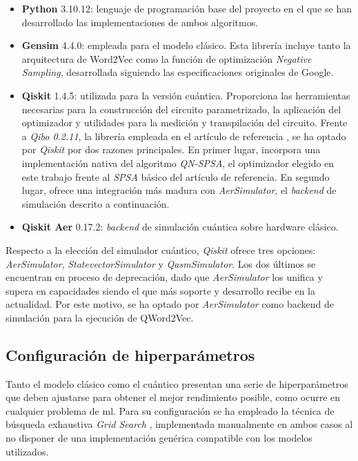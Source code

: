 \begin{itemize}
  \item \textbf{Python} 3.10.12: lenguaje de programación base del proyecto en el que se han desarrollado las implementaciones de ambos algoritmos.
  \item \textbf{Gensim} 4.4.0: empleada para el modelo clásico. Esta librería incluye tanto la arquitectura de Word2Vec como la función de optimización \textit{Negative Sampling}, desarrollada siguiendo las especificaciones originales de Google.
  \item \textbf{Qiskit} 1.4.5: utilizada para la versión cuántica. Proporciona las herramientas necesarias para la construcción del circuito parametrizado, la aplicación del optimizador y utilidades para la medición y transpilación del circuito. Frente a \textit{Qibo 0.2.11}, la librería empleada en el artículo de referencia \cite{ohno_qword2vec_2025}, se ha optado por \textit{Qiskit} por dos razones principales. En primer lugar, incorpora una implementación nativa del algoritmo \textit{QN-SPSA}, el optimizador elegido en este trabajo frente al \textit{SPSA} básico del artículo de referencia. En segundo lugar, ofrece una integración más madura con \textit{AerSimulator}, el \textit{backend} de simulación descrito a continuación.
  \item \textbf{Qiskit Aer} 0.17.2: \textit{backend} de simulación cuántica sobre hardware clásico.
\end{itemize}

Respecto a la elección del simulador cuántico, \textit{Qiskit} ofrece tres opciones: \textit{AerSimulator}, \textit{StatevectorSimulator} y \textit{QasmSimulator}. Los dos últimos se encuentran en proceso de deprecación, dado que \textit{AerSimulator} los unifica y supera en capacidades siendo el que más soporte y desarrollo recibe en la actualidad. Por este motivo, se ha optado por \textit{AerSimulator} como backend de simulación para la ejecución de QWord2Vec.

\subsection{Configuración de hiperparámetros}

Tanto el modelo clásico como el cuántico presentan una serie de hiperparámetros que deben ajustarse para obtener el mejor rendimiento posible, como ocurre en cualquier problema de \gls{ml}. Para su configuración se ha empleado la técnica de búsqueda exhaustiva \textit{Grid Search} \cite{dremio_grid_2026}, implementada manualmente en ambos casos al no disponer de una implementación genérica compatible con los modelos utilizados.

